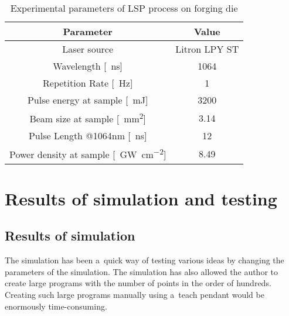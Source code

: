 \begin{table}[h!]
\centering
    \begin{threeparttable}
            \caption{Experimental parameters of LSP process on \mbox{forging} die}
        \begin{tabular}{|c | c|} 
        \hline
            \textbf{Parameter} & \textbf{Value} \\ [0.5ex] 
        \hline
        Laser source & Litron LPY ST  \\
        \hline
        Wavelength [\SI{}{\nano\second}] & 1064 \\
        \hline
        Repetition Rate [\SI{}{\hertz}] & 1  \\ 
        \hline
            Pulse energy at sample [\SI{}{\milli\joule}] & 3200 \\
        \hline
            Beam size at sample [\SI{}{\mm\squared}] & 3.14 \\
        \hline
            Pulse Length @1064nm [\SI{}{\nano\second}] & 12 \\
        \hline
            Power density at sample [\SI{}{\giga\watt\per\cm\squared}] & 8.49 \\

        \hline
        \end{tabular}


        \label{experimental_forging}
    \end{threeparttable}
\end{table}

\begin{comment}
\begin{figure}[h!]
    \centering
    \noindent\shadowimage[width=0.7\linewidth]{img/cast.jpeg}
    \caption{Forging die mounted on the robotic arm}
    \label{fig:cast}
\end{figure}
\end{comment}

\section{Results of simulation and testing}

\subsection{Results of simulation}

The simulation has been a~quick way of testing various ideas by changing the parameters of the simulation. The simulation has also allowed the author to create large programs with the number of points in the order of hundreds. Creating such large programs manually using a~teach pendant would be enormously time-consuming. 


